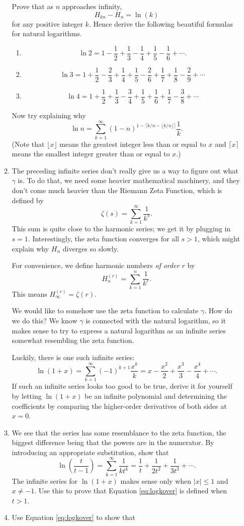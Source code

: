\documentclass[a4paper,10pt]{article}
\begin{document}
\begin{enumerate}
\begin{enumerate}
  Prove that as \(n\) approaches infinity,
  \[H_{kn}-H_{n}=\ln(k)\] for any positive integer \(k\).
  Hence derive the following beautiful formulas for  natural
  logarithms.
  \begin{enumerate}
  \item 
  \[
    \ln2=1-\frac{1}{2}+\frac{1}{3}-\frac{1}{4}+\frac{1}{5}-\frac{1}{6}+\cdots.
  \]
\item
  \[
    \ln3=1+\frac{1}{2}-\frac{2}{3}+\frac{1}{4}+\frac{1}{5}-\frac{2}{6}+\frac{1}{7}+\frac{1}{8}-\frac{2}{9}+\cdots
  \]
\item
  \[
    \ln4=1+\frac{1}{2}+\frac{1}{3}-\frac{3}{4}+\frac{1}{5}+\frac{1}{6}+\frac{1}{7}-\frac{3}{8}+\cdots
  \]
  \end{enumerate}
Now try explaining why
  \[\ln n=\sum_{k=1}^{\infty}(1-n)^{1-\lceil k/n-\lfloor k/n\rfloor\rceil}\frac{1}{k}.
  \]
  (Note that \(\lfloor x\rfloor\) means the greatest integer less than or equal to \(x\) and \(\lceil x\rceil\) means the smallest integer greater than or equal to \(x\).)
\item The preceding infinite series don't really give us a way to figure
  out what \(\gamma\) is. To do that, we need some heavier mathematical
  machinery, and they don't come much heavier than the Riemann Zeta Function,
  which is defined by \[\zeta(s)=\sum_{k=1}^{\infty}\frac{1}{k^s}.\]
  This sum is quite close to the harmonic series; we get it by plugging
  in \(s=1\). Interestingly, the zeta function converges for all
  \(s>1\), which might explain why \(H_n\) diverges so slowly.

  For convenience, we define harmonic numbers \emph{of order \(r\)}
  by \[H_n^{(r)}=\sum_{k=1}^{n}\frac{1}{k^r}.\]
  This means \(H_{\infty}^{(r)}=\zeta(r)\).

  We would like to somehow use the zeta function to calculate \(\gamma\).
  How do we do this? We know \(\gamma\) is connected with the natural
  logarithm, so it makes sense to try to express a natural logarithm
  as an infinite series somewhat resembling the zeta function.

  Luckily, there is one such infinite series:
  \[\ln(1+x)=\sum_{k=1}^{\infty}(-1)^{k+1}\frac{x^k}{k}=x-\frac{x^2}{2}+\frac{x^3}{3}-\frac{x^4}{4}+\cdots.\]
  If such an infinite series looks too good to be true, derive it for yourself
  by letting \(\ln(1+x)\) be an infinite polynomial and determining the
  coefficients by comparing the higher-order derivatives of both sides at \(x=0\).
\item We see that the series has some resemblance to the zeta function,
  the biggest difference being that the powers are in the numerator. By
  introducing an appropriate substitution, show
  that
  \begin{equation}\label{eq:logkover}
    \ln\left(\frac{t}{t-1}\right)=\sum_{k=1}^{\infty}\frac{1}{kt^k}=\frac{1}{t}+\frac{1}{2t^2}+\frac{1}{3t^3}+\cdots.
  \end{equation}
  The infinite series for \(\ln(1+x)\) makes sense only when \(|x|\le 1\)
  and \(x\not=-1\). Use this to prove that Equation \eqref{eq:logkover} is defined when \(t>1\).
\item Use Equation \eqref{eq:logkover} to show that


\end{enumerate}
\end{enumerate}
\end{document}
